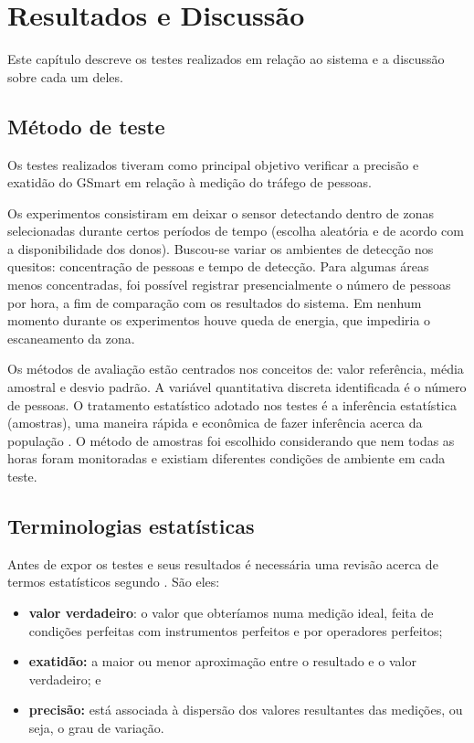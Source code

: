 \chapter{Resultados e Discussão}
\label{resultados-discussao}

Este capítulo descreve os testes realizados em relação ao sistema e a discussão sobre cada um deles.

\section{Método de teste}
\label{metodo-teste}
Os testes realizados tiveram como principal objetivo verificar a precisão e exatidão do GSmart em relação à medição do tráfego de pessoas.

Os experimentos consistiram em deixar o sensor detectando dentro de zonas
selecionadas durante certos períodos de tempo (escolha aleatória e de acordo com a disponibilidade
dos donos). Buscou-se variar os ambientes de detecção nos quesitos: concentração de pessoas e tempo de detecção. Para algumas áreas menos concentradas, foi possível registrar presencialmente o número de
pessoas por hora, a fim de comparação com os resultados do sistema. Em nenhum momento durante os experimentos houve queda de energia, que impediria o escaneamento da zona.

Os métodos de avaliação estão centrados nos conceitos de: valor referência, média amostral e desvio padrão.
A variável quantitativa discreta identificada é o número de pessoas. O tratamento estatístico adotado nos testes
é a inferência estatística (amostras), uma maneira rápida e econômica de fazer
inferência acerca da população \cite{Cabral2004}. O método de amostras
foi escolhido considerando que nem todas as horas foram monitoradas e existiam diferentes condições
de ambiente em cada teste.

\section{Terminologias estatísticas}
Antes de expor os testes e seus resultados é necessária uma revisão acerca de termos estatísticos segundo . São eles:
\begin{itemize}
    \item \textbf{valor verdadeiro}: o valor que obteríamos numa medição ideal, feita de condições
    perfeitas com instrumentos perfeitos e por operadores perfeitos;
    \item \textbf{exatidão:} a maior ou menor aproximação entre o resultado e o valor verdadeiro; e
    \item \textbf{precisão:} está associada à dispersão dos valores resultantes das medições, ou seja, o grau de variação.
\end{itemize}

